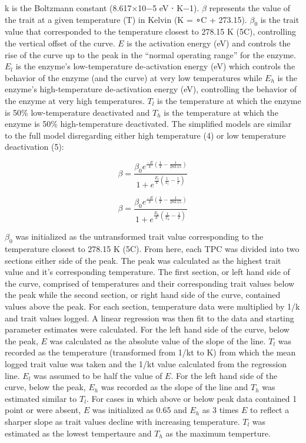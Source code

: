 \documentclass[12pt]{article}
\begin{document}
\begin{linenumbers}
k is the Boltzmann constant (8.617×10−5 eV ⋅ K−1).  \(\beta\) represents the value of the trait at a given temperature (T) in Kelvin (K = ∘C + 273.15). \(\beta_0\) is the trait value that corresponded to the temperature closest to 278.15 K (5\degree C), controlling the vertical offset of the curve. \(E\) is  the activation energy (eV) and controls the rise of the curve up to the peak in the “normal operating range” for the enzyme. \(E_l\) is the enzyme's low-temperature de-activation energy (eV) which controls the behavior of the enzyme (and the curve) at very low temperatures while \(E_h\) is the enzyme's high-temperature de-activation energy (eV), controlling the behavior of the enzyme at very high temperatures. \(T_l\) is the temperature at which the enzyme is 50\% low-temperature deactivated and \(T_h\)  is the temperature at which the enzyme is 50\% high-temperature deactivated. The simplified models are similar to the full model disregarding either high temperature (4) or low temperature deactivation (5):

\begin{equation}
\beta = \frac{\beta_0 e^{\frac{-E}{k} (\frac{1}{T} - \frac{1}{283.15})}}
{ 1  + e^{\frac{E_l}{k} (\frac{1}{T_l} - \frac{1}{T})}}\tag{4}
\end{equation}

\begin{equation}
\beta = \frac{\beta_0 e^{\frac{-E}{k} (\frac{1}{T} - \frac{1}{283.15})}}
{ 1  + e^{\frac{E_h}{k} (\frac{1}{T_h} - \frac{1}{T})}}\tag{5}
\end{equation}


\(\beta_0\) was initialized as the untransformed trait value corresponding to the temperature closest to 278.15 K (5\degree C). From here, each TPC was divided into two sections either side of the peak. The peak was calculated as the highest trait value and it's corresponding temperature. The first section, or left hand side of the curve, comprised of temperatures and their corresponding trait values below the peak while the second section, or right hand side of the curve, contained values above the peak. For each section, temperature data were multiplied by 1/k and trait values logged. A linear regression was then fit to the data and starting parameter estimates were calculated. For the left hand side of the curve, below the peak, \(E\) was calculated as the absolute value of the slope of the line. \(T_l\) was recorded as the temperature (transformed from 1/kt to K) from which the mean logged trait value was taken and the 1/kt value calculated from the regression line. \(E_l\) was assumed to be half the value of \(E\). For the left hand side of the curve, below the peak, \(E_h \) was recorded as the slope of the line and \(T_h\) was estimated similar to \(T_l\). For cases in which above or below peak data contained 1 point or were absent, \(E\) was initialized as 0.65 and \(E_h \) as 3 times \(E\) to reflect a sharper slope as trait values decline with increasing temperature. \(T_l\) was estimated as the lowest tempertaure and \(T_h\) as the maximum temperture.


\end{linenumbers}
\end{document}
